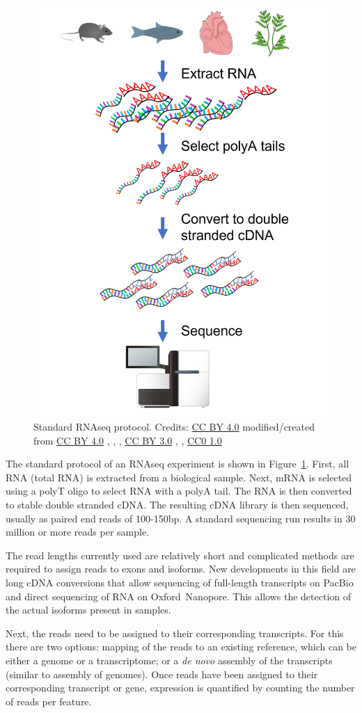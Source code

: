 \begin{figure}[!htbp]
\centering
\includegraphics[width=0.4375\linewidth]{files/RNAseq-protocol-5145db85e92cd8e5569c2b42243f6a4e.png}
\caption[]{Standard RNAseq protocol. \newline
Credits: \href{https://creativecommons.org/licenses/by/4.0/}{CC BY 4.0} \cite{own_5_2024} modified/created from \newline
\href{https://creativecommons.org/licenses/by/4.0/}{CC BY 4.0} \cite{RNAseq_seq_2011}, \cite{RNAseq_plant_2023}, \cite{RNAseq_seq_2020}, \href{https://creativecommons.org/licenses/by/3.0}{CC BY 3.0} \cite{RNAseq_mouse_2013}, \cite{RNAseq_heart_2016}, \href{https://creativecommons.org/publicdomain/zero/1.0}{CC0 1.0} \cite{RNAseq_fish_2014}}
\label{RNAseq_protocol}
\end{figure}

The standard protocol of an RNAseq experiment is shown in Figure~\ref{RNAseq_protocol}.
First, all RNA (total RNA) is extracted from a biological sample.
Next, mRNA is selected using a polyT oligo to select RNA with a polyA tail.
The RNA is then converted to stable double stranded cDNA.
The resulting cDNA library is then sequenced, usually as paired end reads of 100-150bp.
A standard sequencing run results in 30 million or more reads per sample.

The read lengths currently used are relatively short and complicated methods
are required to assign reads to exons and isoforms. New developments in this
field are long cDNA conversions that allow sequencing of full-length
transcripts on PacBio and direct sequencing of RNA on Oxford~Nanopore.
This allows the detection of the actual isoforms present in samples.

Next, the reads need to be assigned to their corresponding transcripts. For
this there are two options: mapping of the reads to an existing reference,
which can be either a genome or a transcriptome; or a \textit{de novo} assembly of the
transcripts (similar to assembly of genomes). Once reads have been assigned
to their corresponding transcript or gene, expression is quantified by
counting the number of reads per feature.

